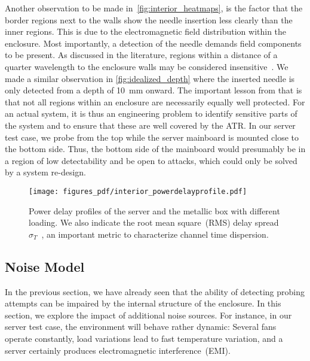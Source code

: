 \documentclass[conference]{IEEEtran}
\begin{document}
Another observation to be made in~\autoref{fig:interior_heatmaps}, is the factor that the border regions next to the walls show the needle insertion less clearly than the inner regions. This is due to the electromagnetic field distribution within the enclosure. Most importantly, a detection of the needle demands field components to be present. As discussed in the literature, regions within a distance of a quarter wavelength to the enclosure walls may be considered insensitive~\cite{serraReverberationChambersCarte21}. We made a similar observation in \autoref{fig:idealized_depth} where the inserted needle is only detected from a depth of \SI{10}{\mm} onward. The important lesson from that is that not all regions within an enclosure are necessarily equally well protected. For an actual system, it is thus an engineering problem to identify sensitive parts of the system and to ensure that these are well covered by the ATR. In our server test case, we probe from the top while the server mainboard is mounted close to the bottom side. Thus, the bottom side of the mainboard would presumably be in a region of low detectability and be open to attacks, which could only be solved by a system re-design.







\begin{figure}
\centering
\texttt{[image: figures\_pdf/interior\_powerdelayprofile.pdf]}
\caption{Power delay profiles of the server and the metallic box with different loading. We also indicate the root mean square~(RMS) delay spread $\sigma_T$~\cite{goldsmith_wireless_2005}, an important metric to characterize channel time dispersion.}
\label{fig:enclosure_vs_server_pdp}
\end{figure}



\subsection{Noise Model}
In the previous section, we have already seen that the ability of detecting probing attempts can be impaired by the internal structure of the enclosure. In this section, we explore the impact of additional noise sources. For instance, in our server test case, the environment will behave rather dynamic: Several fans operate constantly, load variations lead to fast temperature variation, and a server certainly produces electromagnetic interference~(EMI).
\end{document}
